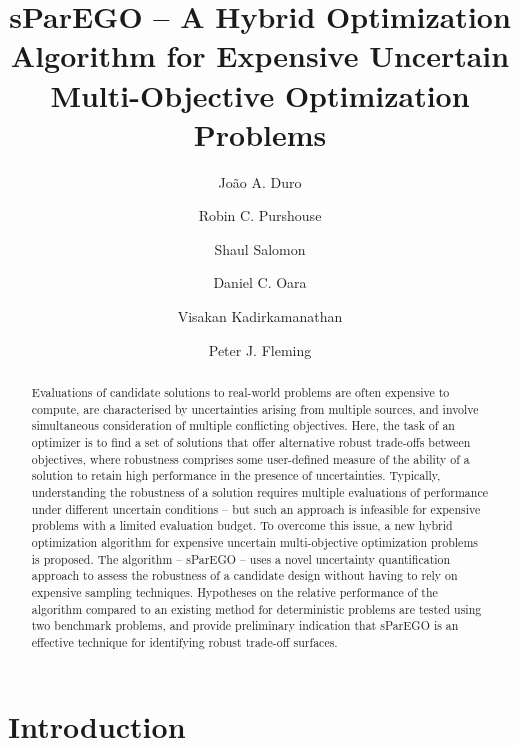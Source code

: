 \documentclass{llncs}
\begin{document}
\title{sParEGO -- A Hybrid Optimization Algorithm for Expensive Uncertain Multi-Objective Optimization Problems}
\author{Jo\~{a}o A. Duro \and Robin C. Purshouse \and Shaul Salomon \and Daniel C. Oara \and Visakan Kadirkamanathan \and Peter J. Fleming}

\maketitle

\begin{abstract}
Evaluations of candidate solutions to real-world problems are often expensive to compute, are characterised by uncertainties arising from multiple sources, and involve simultaneous consideration of multiple conflicting objectives. Here, the task of an optimizer is to find a set of solutions that offer alternative robust trade-offs between objectives, where robustness comprises some user-defined measure of the ability of a solution to retain high performance in the presence of uncertainties. Typically, understanding the robustness of a solution requires multiple evaluations of performance under different uncertain conditions -- but such an approach is infeasible for expensive problems with a limited evaluation budget. To overcome this issue, a new hybrid optimization algorithm for expensive uncertain multi-objective optimization problems is proposed. The algorithm -- sParEGO -- uses a novel uncertainty quantification approach to assess the robustness of a candidate design without having to rely on expensive sampling techniques. Hypotheses on the relative performance of the algorithm compared to an existing method for deterministic problems are tested using two benchmark problems, and provide preliminary indication that sParEGO is an effective technique for identifying robust trade-off surfaces.
\end{abstract}

\section{Introduction}
\end{document}

